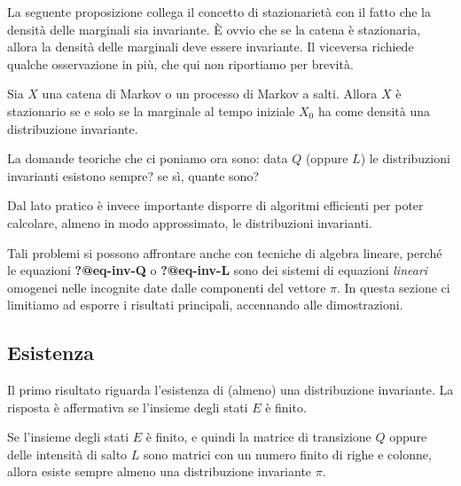 \documentclass[
  italian,
  letterpaper,
]{book}
\theoremstyle{definition}
\theoremstyle{remark}
\begin{document}
La seguente proposizione collega il concetto di stazionarietà con il
fatto che la densità delle marginali sia invariante. È ovvio che se la
catena è stazionaria, allora la densità delle marginali deve essere
invariante. Il viceversa richiede qualche osservazione in più, che qui
non riportiamo per brevità.

Sia \(X\) una catena di Markov o un processo di Markov a salti. Allora
\(X\) è stazionario se e solo se la marginale al tempo iniziale \(X_0\)
ha come densità una distribuzione invariante.

La domande teoriche che ci poniamo ora sono: data \(Q\) (oppure \(L\))
le distribuzioni invarianti esistono sempre? se sì, quante sono?

Dal lato pratico è invece importante disporre di algoritmi efficienti
per poter calcolare, almeno in modo approssimato, le distribuzioni
invarianti.

Tali problemi si possono affrontare anche con tecniche di algebra
lineare, perché le equazioni \textbf{?@eq-inv-Q} o \textbf{?@eq-inv-L}
sono dei sistemi di equazioni \emph{lineari} omogenei nelle incognite
date dalle componenti del vettore \(\pi\). In questa sezione ci
limitiamo ad esporre i risultati principali, accennando alle
dimostrazioni.

\subsection{Esistenza}\label{esistenza}

Il primo risultato riguarda l'esistenza di (almeno) una distribuzione
invariante. La risposta è affermativa se l'insieme degli stati \(E\) è
finito.

Se l'insieme degli stati \(E\) è finito, e quindi la matrice di
transizione \(Q\) oppure delle intensità di salto \(L\) sono matrici con
un numero finito di righe e colonne, allora esiste sempre almeno una
distribuzione invariante \(\pi\).
\end{document}
